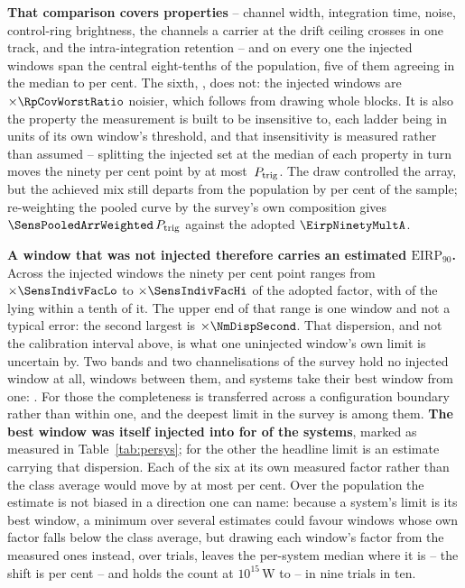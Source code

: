 \textbf{That comparison covers \RpNAxis{} properties} -- channel width,
integration time, noise, control-ring brightness, the channels a carrier at
the drift ceiling crosses in one track, and the intra-integration retention
-- and on every one the injected windows span the central eight-tenths of the
population, five of them agreeing in the median to \RpCovOtherPct{} per cent.
The sixth, \RpCovWorstAxis, does not: the injected windows are
$\times\RpCovWorstRatio$ noisier, which follows from drawing whole blocks. It
is also the property the measurement is built to be insensitive to, each
ladder being in units of its own window's threshold, and that insensitivity
is measured rather than assumed -- splitting the injected set at the median
of each property in turn moves the ninety per cent point by at most
\RpFacShiftMax\,$P_{\rm trig}$. The draw controlled the array, but the
achieved mix still departs from the population by \SensCovWorstPct{} per cent
of the sample; re-weighting the pooled curve by the survey's own composition
gives $\SensPooledArrWeighted\,P_{\rm trig}$ against the adopted
$\EirpNinetyMultA$.

\textbf{A window that was not injected therefore carries an estimated
$\mathrm{EIRP}_{90}$.} Across the injected windows the ninety per cent point
ranges from $\times\SensIndivFacLo$ to $\times\SensIndivFacHi$ of the
adopted factor, with \NmDispNTenth{} of the \SensNInj{} lying within a tenth
of it. The upper end of that range is one window and not a typical error: the
second largest is $\times\NmDispSecond$. That dispersion, and not the calibration
interval above, is what one uninjected window's own limit is uncertain by.
Two bands and two channelisations of the survey hold no injected window at
all, \NgNExtrapWin{} windows between them, and \NgNExtrapSys{} systems take
their best window from one: \NgExtrapSys. For those the completeness is
transferred across a configuration boundary rather than within one, and the
deepest limit in the survey is among them.
\textbf{The best window was itself injected into for \SmcNMeasSys{} of the
\NSysClassA{} systems}, marked as measured in Table~\ref{tab:persys}; for the
other \SmcNEstSys{} the headline limit is an estimate carrying that
dispersion. Each of the six at its own measured
factor rather than the class average would move by at most \NmOwnDevPct{} per
cent. Over the population the estimate is not biased in a direction one can
name: because a system's limit is its best window, a minimum over several
estimates could favour windows whose own factor falls below the class
average, but drawing each window's factor from the \SensNInj{} measured ones
instead, over \ScRsNTrial{} trials, leaves the per-system median where it
is -- the shift is \ScRsMedShiftPct{} per cent -- and holds the count at
$10^{15}$\,W to \ScRsNLo--\ScRsNHi{} in nine trials in ten.

